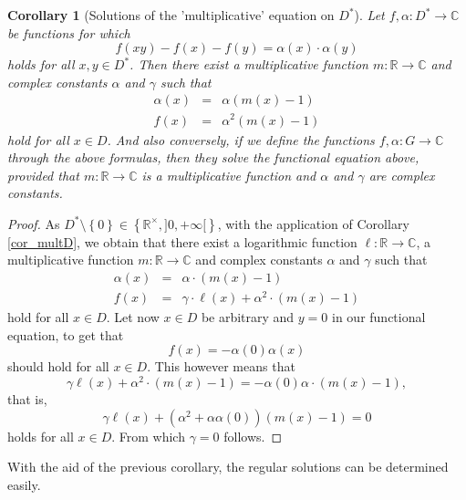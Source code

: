 \documentclass[a4paper,12pt]{article}
\theoremstyle{plain}
\newtheorem{cor}{Corollary}
\theoremstyle{definition}
\theoremstyle{remark}
\begin{document}
\begin{cor}[Solutions of the 'multiplicative' equation on $D^{\ast}$]
 Let  $f, \alpha \colon D^{\ast} \to \mathbb{C}$ be functions for which 
 \[
  f(xy)-f(x)-f(y)= \alpha(x)\cdot \alpha(y)
 \]
 holds for all $x, y\in D^{\ast}$. Then there exist a multiplicative function $m\colon \mathbb{R}\to \mathbb{C}$ and complex constants 
 $\alpha$ and $\gamma$ such that 
 \[
 \begin{array}{rcl}
 \alpha(x)&=& \alpha (m(x)-1)\\
  f(x)&=& \alpha^{2} (m(x)-1)
  \end{array}
   \]
 hold for all $x\in D$. And also conversely, if we define the functions $f, \alpha \colon G\to \mathbb{C}$ through the above formulas, then they solve the functional  equation above, provided that $m\colon \mathbb{R}\to \mathbb{C}$ is a multiplicative function and $\alpha$ and $\gamma$ are complex constants.  
\end{cor}


\begin{proof}
 As $D^{\ast}\setminus \left\{ 0\right\} \in \left\{\mathbb{R}^{\times}, ]0, +\infty [\right\}$, with the application of Corollary \ref{cor_multD}, we obtain that there exist a logarithmic function $\ell \colon \mathbb{R}\to \mathbb{C}$, a multiplicative function $m\colon \mathbb{R}\to \mathbb{C}$ and complex constants 
 $\alpha$ and $\gamma$ such that 
 \begin{equation}
 \begin{array}{rcl}
 \alpha(x)&=& \alpha\cdot (m(x)-1)\\
  f(x)&=& \gamma \cdot \ell (x)+\alpha^{2}\cdot (m(x)-1)
  \end{array}
   \end{equation}
 hold for all $x\in D$. Let now $x\in D$ be arbitrary and $y=0$ in our functional equation, to get that
 \[
  f(x)= -\alpha(0)\alpha(x)
 \]
should hold for all $x\in D$. This however means that 
\[
 \gamma  \ell (x)+\alpha^{2} \cdot (m(x)-1)
 = -\alpha(0) \alpha \cdot (m(x)-1), 
\]
that is, 
\[
 \gamma  \ell (x)+(\alpha^{2}+\alpha  \alpha(0)) (m(x)-1)
 = 0
\]
holds for all $x\in D$. From which $\gamma=0$ follows. 
\end{proof}


With the aid of the previous corollary, the regular solutions can be determined easily. 
\end{document}

